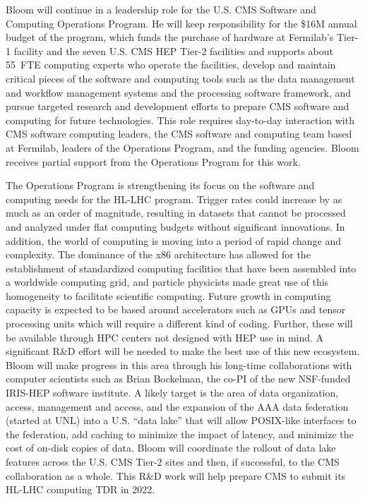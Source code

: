 Bloom will continue in a leadership role for the U.S. CMS Software and Computing Operations Program.  He will keep responsibility for the \$16M annual budget of the program, which funds the purchase of hardware at Fermilab's Tier-1 facility and the seven U.S. CMS HEP Tier-2 facilities and supports about 55~FTE computing experts who operate the facilities, develop and maintain critical pieces of the software and computing tools such as the data management and workflow management systems and the processing software framework, and pursue targeted research and development efforts to prepare CMS software and computing for future technologies.  This role requires day-to-day interaction with CMS software computing leaders, the CMS software and computing team based at Fermilab, leaders of the Operations Program, and the funding agencies.  Bloom receives partial support from the Operations Program for this work.

The Operations Program is strengthening its focus on the software and computing needs for the HL-LHC program.  Trigger rates could increase by as much as an order of magnitude, resulting in datasets that cannot be processed and analyzed under flat computing budgets without significant innovations.  In addition, the world of computing is moving into a period of rapid change and complexity.  The dominance of the x86 architecture has allowed for the establishment of standardized computing facilities that have been assembled into a worldwide computing grid, and particle physicists made great use of this homogeneity to facilitate scientific computing.  Future growth in computing capacity is expected to be based around accelerators such as GPUs and tensor processing units which will require a different kind of coding.  Further, these will be available through HPC centers  not designed with HEP use in mind.  A significant R\&D effort will be needed to make the best use of this new ecosystem.  Bloom will make progress in this area through his long-time collaborations with computer scientists such as Brian Bockelman, the co-PI of the new NSF-funded IRIS-HEP software institute.  A likely target is the area of data organization, access, management and access, and the expansion of the AAA data federation (started at UNL) into a U.S. ``data lake'' that will allow POSIX-like interfaces to the federation, add caching to minimize the impact of latency, and minimize the cost of on-disk copies of data.  Bloom will coordinate the rollout of data lake features across the U.S. CMS Tier-2 sites and then, if successful, to the CMS collaboration as a whole.  This R\&D work will help prepare CMS to submit its HL-LHC computing TDR in 2022.

